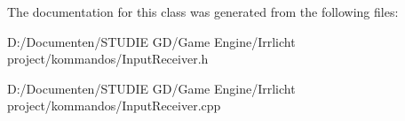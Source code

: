The documentation for this class was generated from the following files\+:\begin{DoxyCompactItemize}
\item 
D\+:/\+Documenten/\+S\+T\+U\+D\+I\+E G\+D/\+Game Engine/\+Irrlicht project/kommandos/Input\+Receiver.\+h\item 
D\+:/\+Documenten/\+S\+T\+U\+D\+I\+E G\+D/\+Game Engine/\+Irrlicht project/kommandos/Input\+Receiver.\+cpp\end{DoxyCompactItemize}

